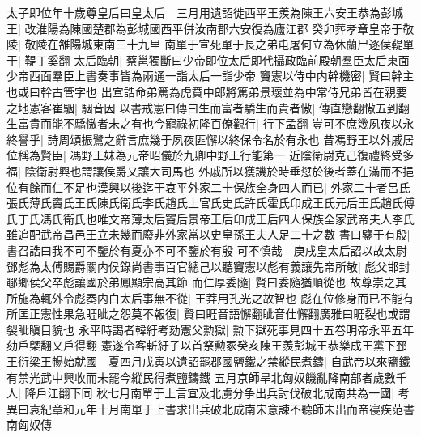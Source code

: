 太子即位年十歲尊皇后曰皇太后　三月用遺詔徙西平王羨為陳王六安王恭為彭城王|{
	改淮陽為陳國楚郡為彭城國西平併汝南郡六安復為廬江郡}
癸卯葬孝章皇帝于敬陵|{
	敬陵在雒陽城東南三十九里}
南單于宣死單于長之弟屯屠何立為休蘭尸逐侯鞮單于|{
	鞮丁奚翻}
太后臨朝|{
	蔡邕獨斷曰少帝即位太后即代攝政臨前殿朝羣臣太后東面少帝西面羣臣上書奏事皆為兩通一詣太后一詣少帝}
竇憲以侍中内幹機密|{
	賢曰幹主也或曰幹古管字也}
出宣誥命弟篤為虎賁中郎將篤弟景瓌並為中常侍兄弟皆在親要之地憲客崔駰|{
	駰音因}
以書戒憲曰傳曰生而富者驕生而貴者慠|{
	傳直戀翻慠五到翻}
生富貴而能不驕慠者未之有也今寵祿初隆百僚觀行|{
	行下孟翻}
豈可不庶幾夙夜以永終譽乎|{
	詩周頌振鷺之辭言庶幾于夙夜匪懈以終保令名於有永也}
昔馮野王以外戚居位稱為賢臣|{
	馮野王妹為元帝昭儀於九卿中野王行能第一}
近陰衛尉克己復禮終受多福|{
	陰衛尉興也謂讓侯爵又讓大司馬也}
外戚所以獲譏於時垂愆於後者蓋在滿而不挹位有餘而仁不足也漢興以後迄于哀平外家二十保族全身四人而已|{
	外家二十者呂氏張氏薄氏竇氏王氏陳氏衛氏李氏趙氏上官氏史氏許氏霍氏卬成王氏元后王氏趙氏傅氏丁氏馮氏衛氏也唯文帝薄太后竇后景帝王后卬成王后四人保族全家武帝夫人李氏雖追配武帝昌邑王立未幾而廢非外家當以史皇孫王夫人足二十之數}
書曰鑒于有殷|{
	書召誥曰我不可不鑒於有夏亦不可不鑒於有殷}
可不慎哉　庚戌皇太后詔以故太尉鄧彪為太傅賜爵關内侯錄尚書事百官總己以聽竇憲以彪有義讓先帝所敬|{
	彪父邯封鄳鄉侯父卒彪讓國於弟鳳顯宗高其節}
而仁厚委隨|{
	賢曰委隨猶順從也}
故尊崇之其所施為輒外令彪奏内白太后事無不從|{
	王莽用孔光之故智也}
彪在位修身而已不能有所匡正憲性果急睚眦之怨莫不報復|{
	賢曰睚音語懈翻眦音仕懈翻廣雅曰睚裂也或謂裂眦瞋目貌也}
永平時謁者韓紆考劾憲父勲獄|{
	勲下獄死事見四十五卷明帝永平五年劾戶槩翻又戶得翻}
憲遂令客斬紆子以首祭勲冢癸亥陳王羨彭城王恭樂成王黨下邳王衍梁王暢始就國　夏四月戊寅以遺詔罷郡國鹽鐵之禁縱民煮鑄|{
	自武帝以來鹽鐵有禁光武中興收而未罷今縱民得煮鹽鑄鐵}
五月京師旱北匈奴饑亂降南部者歲數千人|{
	降戶江翻下同}
秋七月南單于上言宜及北虜分争出兵討伐破北成南共為一國|{
	考異曰袁紀章和元年十月南單于上書求出兵破北成南宋意諫不聽師未出而帝寑疾范書南匈奴傳}


